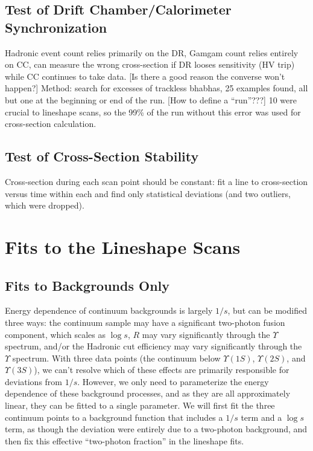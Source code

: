 \documentclass[aps,prd,preprint,superscriptaddress,tightenlines,nofootinbib,floatfix]{revtex4}
\begin{document}
%
\subsection{Test of Drift Chamber/Calorimeter Synchronization}
%

Hadronic event count relies primarily on the DR, Gamgam count relies
entirely on CC, can measure the wrong cross-section if DR looses
sensitivity (HV trip) while CC continues to take data.  [Is there a
good reason the converse won't happen?]  Method: search for excesses
of trackless bhabhas, 25 examples found, all but one at the beginning
or end of the run.  [How to define a ``run''???]  10 were crucial to
lineshape scans, so the 99\% of the run without this error was used
for cross-section calculation.

%
\subsection{Test of Cross-Section Stability}
%

Cross-section during each scan point should be constant: fit a line to
cross-section versus time within each and find only statistical
deviations (and two outliers, which were dropped).

%
\section{Fits to the Lineshape Scans}
%

%
\subsection{Fits to Backgrounds Only}
%

Energy dependence of continuum backgrounds is largely $1/s$, but can
be modified three ways: the continuum sample may have a significant
two-photon fusion component, which scales as $\log s$, $R$ may vary
significantly through the $\Upsilon$ spectrum, and/or the Hadronic cut
efficiency may vary significantly through the $\Upsilon$ spectrum.
With three data points (the continuum below $\Upsilon(1S)$,
$\Upsilon(2S)$, and $\Upsilon(3S)$), we can't resolve which of these
effects are primarily responsible for deviations from $1/s$.  However,
we only need to parameterize the energy dependence of these background
processes, and as they are all approximately linear, they can be
fitted to a single parameter.  We will first fit the three continuum
points to a background function that includes a $1/s$ term and a $\log
s$ term, as though the deviation were entirely due to a two-photon
background, and then fix this effective ``two-photon fraction'' in the
lineshape fits.
\end{document}
